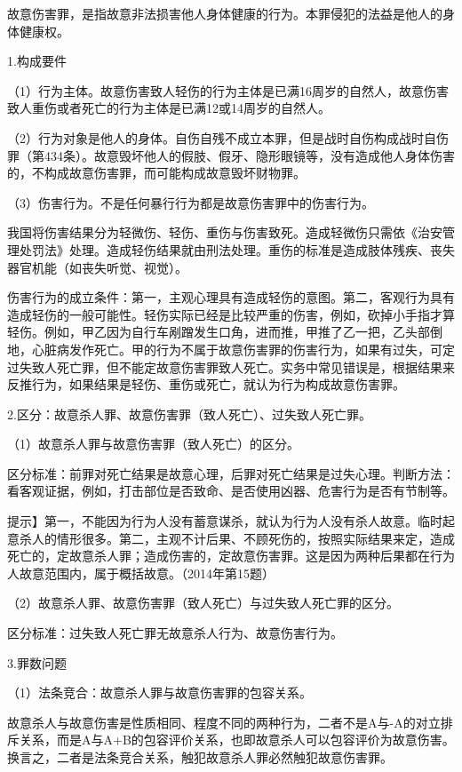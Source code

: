 故意伤害罪，是指故意非法损害他人身体健康的行为。本罪侵犯的法益是他人的身体健康权。

1.构成要件

（1）行为主体。故意伤害致人轻伤的行为主体是已满16周岁的自然人，故意伤害致人重伤或者死亡的行为主体是已满12或14周岁的自然人。

（2）行为对象是他人的身体。自伤自残不成立本罪，但是战时自伤构成战时自伤罪（第434条）。故意毁坏他人的假肢、假牙、隐形眼镜等，没有造成他人身体伤害的，不构成故意伤害罪，而可能构成故意毁坏财物罪。

（3）伤害行为。不是任何暴行行为都是故意伤害罪中的伤害行为。

我国将伤害结果分为轻微伤、轻伤、重伤与伤害致死。造成轻微伤只需依《治安管理处罚法》处理。造成轻伤结果就由刑法处理。重伤的标准是造成肢体残疾、丧失器官机能（如丧失听觉、视觉）。

伤害行为的成立条件：第一，主观心理具有造成轻伤的意图。第二，客观行为具有造成轻伤的一般可能性。轻伤实际已经是比较严重的伤害，例如，砍掉小手指才算轻伤。例如，甲乙因为自行车剐蹭发生口角，进而推，甲推了乙一把，乙头部倒地，心脏病发作死亡。甲的行为不属于故意伤害罪的伤害行为，如果有过失，可定过失致人死亡罪，但不能定故意伤害罪致人死亡。实务中常见错误是，根据结果来反推行为，如果结果是轻伤、重伤或死亡，就认为行为构成故意伤害罪。

2.区分：故意杀人罪、故意伤害罪（致人死亡）、过失致人死亡罪。

（1）故意杀人罪与故意伤害罪（致人死亡）的区分。

区分标准：前罪对死亡结果是故意心理，后罪对死亡结果是过失心理。判断方法：看客观证据，例如，打击部位是否致命、是否使用凶器、危害行为是否有节制等。

提示】第一，不能因为行为人没有蓄意谋杀，就认为行为人没有杀人故意。临时起意杀人的情形很多。第二，主观不计后果、不顾死伤的，按照实际结果来定，造成死亡的，定故意杀人罪；造成伤害的，定故意伤害罪。这是因为两种后果都在行为人故意范围内，属于概括故意。（2014年第15题）

（2）故意杀人罪、故意伤害罪（致人死亡）与过失致人死亡罪的区分。

区分标准：过失致人死亡罪无故意杀人行为、故意伤害行为。

3.罪数问题

（1）法条竞合：故意杀人罪与故意伤害罪的包容关系。

故意杀人与故意伤害是性质相同、程度不同的两种行为，二者不是A与-A的对立排斥关系，而是A与A+B的包容评价关系，也即故意杀人可以包容评价为故意伤害。换言之，二者是法条竞合关系，触犯故意杀人罪必然触犯故意伤害罪。

